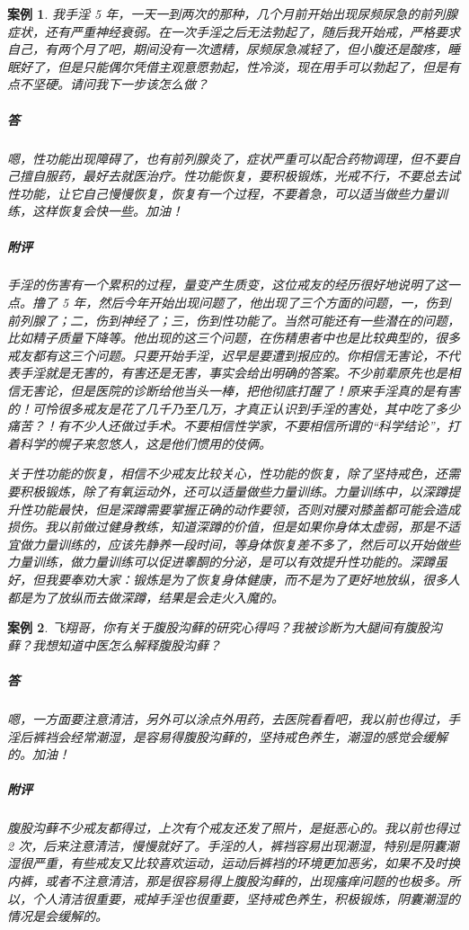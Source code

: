 \documentclass{ctexart}
\newtheorem{case}{案例}
\begin{document}
\begin{case}
    我手淫 5 年，一天一到两次的那种，几个月前开始出现尿频尿急的前列腺症状，还有严重神经衰弱。在一次手淫之后无法勃起了，随后我开始戒，严格要求自己，有两个月了吧，期间没有一次遗精，尿频尿急减轻了，但小腹还是酸疼，睡眠好了，但是只能偶尔凭借主观意愿勃起，性冷淡，现在用手可以勃起了，但是有点不坚硬。请问我下一步该怎么做？
    \subparagraph{答} 嗯，性功能出现障碍了，也有前列腺炎了，症状严重可以配合药物调理，但不要自己擅自服药，最好去就医治疗。性功能恢复，要积极锻炼，光戒不行，不要总去试性功能，让它自己慢慢恢复，恢复有一个过程，不要着急，可以适当做些力量训练，这样恢复会快一些。加油！
    \subparagraph{附评} 手淫的伤害有一个累积的过程，量变产生质变，这位戒友的经历很好地说明了这一点。撸了 5 年，然后今年开始出现问题了，他出现了三个方面的问题，一，伤到前列腺了；二，伤到神经了；三，伤到性功能了。当然可能还有一些潜在的问题，比如精子质量下降等。他出现的这三个问题，在伤精患者中也是比较典型的，很多戒友都有这三个问题。只要开始手淫，迟早是要遭到报应的。你相信无害论，不代表手淫就是无害的，有害还是无害，事实会给出明确的答案。不少前辈原先也是相信无害论，但是医院的诊断给他当头一棒，把他彻底打醒了！原来手淫真的是有害的！可怜很多戒友是花了几千乃至几万，才真正认识到手淫的害处，其中吃了多少痛苦？！有不少人还做过手术。不要相信性学家，不要相信所谓的“科学结论”，打着科学的幌子来忽悠人，这是他们惯用的伎俩。

    关于性功能的恢复，相信不少戒友比较关心，性功能的恢复，除了坚持戒色，还需要积极锻炼，除了有氧运动外，还可以适量做些力量训练。力量训练中，以深蹲提升性功能最快，但是深蹲需要掌握正确的动作要领，否则对腰对膝盖都可能会造成损伤。我以前做过健身教练，知道深蹲的价值，但是如果你身体太虚弱，那是不适宜做力量训练的，应该先静养一段时间，等身体恢复差不多了，然后可以开始做些力量训练，做力量训练可以促进睾酮的分泌，是可以有效提升性功能的。深蹲虽好，但我要奉劝大家：锻炼是为了恢复身体健康，而不是为了更好地放纵，很多人都是为了放纵而去做深蹲，结果是会走火入魔的。
\end{case}

\begin{case}
    飞翔哥，你有关于腹股沟藓的研究心得吗？我被诊断为大腿间有腹股沟藓？我想知道中医怎么解释腹股沟藓？
    \subparagraph{答} 嗯，一方面要注意清洁，另外可以涂点外用药，去医院看看吧，我以前也得过，手淫后裤裆会经常潮湿，是容易得腹股沟藓的，坚持戒色养生，潮湿的感觉会缓解的。加油！
    \subparagraph{附评} 腹股沟藓不少戒友都得过，上次有个戒友还发了照片，是挺恶心的。我以前也得过 2 次，后来注意清洁，慢慢就好了。手淫的人，裤裆容易出现潮湿，特别是阴囊潮湿很严重，有些戒友又比较喜欢运动，运动后裤裆的环境更加恶劣，如果不及时换内裤，或者不注意清洁，那是很容易得上腹股沟藓的，出现瘙痒问题的也极多。所以，个人清洁很重要，戒掉手淫也很重要，坚持戒色养生，积极锻炼，阴囊潮湿的情况是会缓解的。
\end{case}
\end{document}
